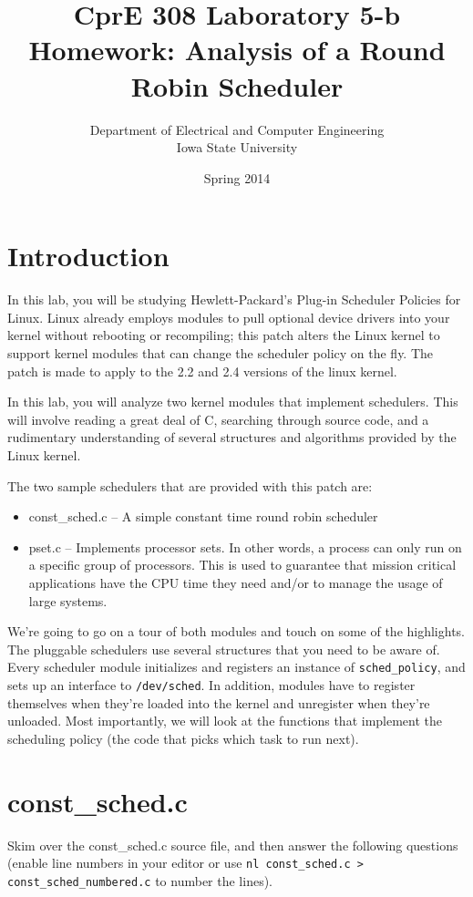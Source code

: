 \documentclass[letterpaper,10pt]{article}
\title{CprE 308 Laboratory 5-b Homework: Analysis of a Round Robin Scheduler}
\author{Department of Electrical and Computer Engineering \\ Iowa State University}
\date{Spring 2014}
\begin{document}
\maketitle

\section{Introduction}
In this lab, you will be studying Hewlett-Packard's Plug-in Scheduler Policies for Linux.
Linux already employs modules to pull optional device drivers into your kernel without
rebooting or recompiling; this patch alters the Linux kernel to support kernel modules that
can change the scheduler policy on the fly. The patch is made to apply to the 2.2 and 2.4
versions of the linux kernel.

In this lab, you will analyze two kernel modules that implement schedulers. This will
involve reading a great deal of C, searching through source code, and a rudimentary
understanding of several structures and algorithms provided by the Linux kernel.

The two sample schedulers that are provided with this patch are:
\begin{itemize}
\item const\_sched.c -- A simple constant time round robin scheduler
\item pset.c -- Implements processor sets. In other words, a process can only run on a specific
group of processors. This is used to guarantee that mission critical applications have the
CPU time they need and/or to manage the usage of large systems.
\end{itemize}

We're going to go on a tour of both modules and touch on some of the highlights. The
pluggable schedulers use several structures that you need to be aware of. Every
scheduler module initializes and registers an instance of \verb=sched_policy=, and sets up an
interface to \verb+/dev/sched+. In addition, modules have to register themselves when they're
loaded into the kernel and unregister when they're unloaded. Most importantly, we will
look at the functions that implement the scheduling policy (the code that picks which task
to run next).

\section{const\_sched.c}
Skim over the const\_sched.c source file, and then answer the following questions (enable
line numbers in your editor or use \verb+nl const_sched.c > const_sched_numbered.c+ to number the lines).
\end{document}
